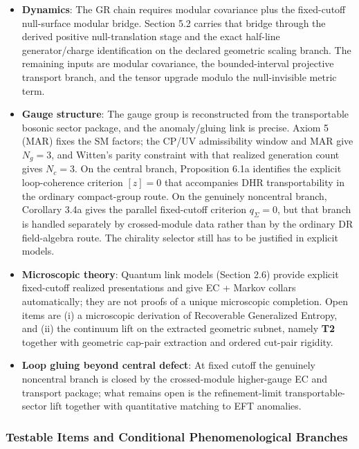 \begin{itemize}
\tightlist
\item
  \textbf{Dynamics}: The GR chain requires modular covariance plus the fixed-cutoff null-surface modular bridge. Section 5.2 carries that bridge through the derived positive null-translation stage and the exact half-line generator/charge identification on the declared geometric scaling branch. The remaining inputs are modular covariance, the bounded-interval projective transport branch, and the tensor upgrade modulo the null-invisible metric term.
\item
  \textbf{Gauge structure}: The gauge group is reconstructed from the transportable bosonic sector package, and the anomaly/gluing link is precise. Axiom 5 (MAR) fixes the SM factors; the CP/UV admissibility window and MAR give \(N_g = 3\), and Witten's parity constraint with that realized generation count gives \(N_c = 3\). On the central branch, Proposition 6.1a identifies the explicit loop-coherence criterion \([z]=0\) that accompanies DHR transportability in the ordinary compact-group route. On the genuinely noncentral branch, Corollary 3.4a gives the parallel fixed-cutoff criterion \(q_\Sigma=0\), but that branch is handled separately by crossed-module data rather than by the ordinary DR field-algebra route. The chirality selector still has to be justified in explicit models.
\item
  \textbf{Microscopic theory}: Quantum link models (Section 2.6) provide explicit fixed-cutoff realized presentations and give EC + Markov collars automatically; they are not proofs of a unique microscopic completion. Open items are (i) a microscopic derivation of Recoverable Generalized Entropy, and (ii) the continuum lift on the extracted geometric subnet, namely \textbf{T2} together with geometric cap-pair extraction and ordered cut-pair rigidity.
\item
  \textbf{Loop gluing beyond central defect}: At fixed cutoff the genuinely noncentral branch is closed by the crossed-module higher-gauge EC and transport package; what remains open is the refinement-limit transportable-sector lift together with quantitative matching to EFT anomalies.
\end{itemize}

\subsubsection{Testable Items and Conditional Phenomenological Branches}\label{83-novel-testable-predictions}


